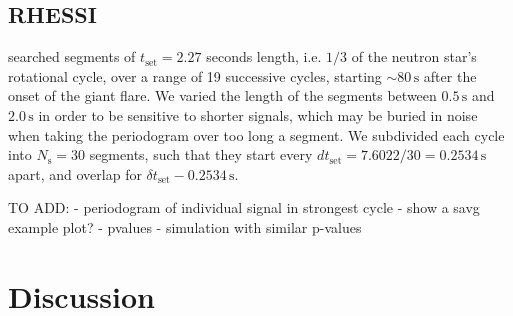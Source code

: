 \documentclass{emulateapj}
\begin{document}
\subsection{RHESSI}
\label{sec:rhessi_results}

\citealt{Watts06} searched segments of $t_{\mathrm{set}} = 2.27$ seconds length, i.e. $1/3$ of the neutron star's rotational cycle, over a range of 19 successive cycles, starting $\sim 80 \, \mathrm{s}$ after the onset of the giant flare. We varied the length of the segments between $0.5 \, \mathrm{s}$ and $2.0 \, \mathrm{s}$ in order to be sensitive to shorter signals, which may be buried in noise when taking the periodogram over too long a segment. We subdivided each cycle into $N_\mathrm{s} = 30$ segments, such that they start every $d t_\mathrm{set}= 7.6022/30 = 0.2534 \, \mathrm{s}$ apart, and overlap for $\delta t_\mathrm{set} - 0.2534 \, \mathrm{s}$.


TO ADD:
- periodogram of individual signal in strongest cycle
- show a savg example plot?
- pvalues
- simulation with similar p-values


\section{Discussion}
\label{sec:discussion}



\end{document}
